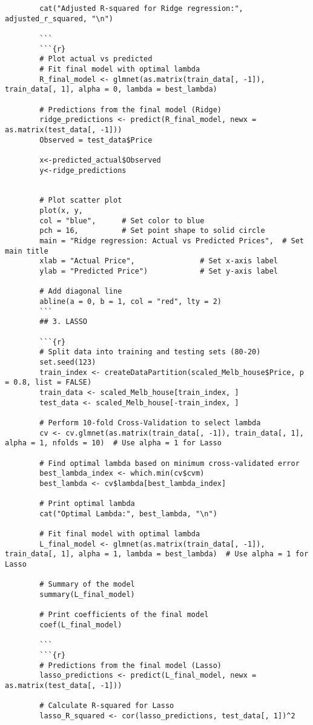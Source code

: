 \documentclass[12pt,doublespace]{article}
\begin{document}
\begin{lstlisting}
		cat("Adjusted R-squared for Ridge regression:", adjusted_r_squared, "\n")
		
		```
		```{r}
		# Plot actual vs predicted 
		# Fit final model with optimal lambda
		R_final_model <- glmnet(as.matrix(train_data[, -1]), train_data[, 1], alpha = 0, lambda = best_lambda)
		
		# Predictions from the final model (Ridge)
		ridge_predictions <- predict(R_final_model, newx = as.matrix(test_data[, -1]))
		Observed = test_data$Price
		
		x<-predicted_actual$Observed
		y<-ridge_predictions
		
		
		# Plot scatter plot
		plot(x, y, 
		col = "blue",      # Set color to blue
		pch = 16,          # Set point shape to solid circle
		main = "Ridge regression: Actual vs Predicted Prices",  # Set main title
		xlab = "Actual Price",               # Set x-axis label
		ylab = "Predicted Price")            # Set y-axis label
		
		# Add diagonal line
		abline(a = 0, b = 1, col = "red", lty = 2)
		```
		## 3. LASSO
		
		```{r}
		# Split data into training and testing sets (80-20)
		set.seed(123)
		train_index <- createDataPartition(scaled_Melb_house$Price, p = 0.8, list = FALSE)
		train_data <- scaled_Melb_house[train_index, ]
		test_data <- scaled_Melb_house[-train_index, ]
		
		# Perform 10-fold Cross-Validation to select lambda
		cv <- cv.glmnet(as.matrix(train_data[, -1]), train_data[, 1], alpha = 1, nfolds = 10)  # Use alpha = 1 for Lasso
		
		# Find optimal lambda based on minimum cross-validated error
		best_lambda_index <- which.min(cv$cvm)
		best_lambda <- cv$lambda[best_lambda_index]
		
		# Print optimal lambda
		cat("Optimal Lambda:", best_lambda, "\n")
		
		# Fit final model with optimal lambda
		L_final_model <- glmnet(as.matrix(train_data[, -1]), train_data[, 1], alpha = 1, lambda = best_lambda)  # Use alpha = 1 for Lasso
		
		# Summary of the model
		summary(L_final_model)
		
		# Print coefficients of the final model
		coef(L_final_model)
		
		```
		```{r}
		# Predictions from the final model (Lasso)
		lasso_predictions <- predict(L_final_model, newx = as.matrix(test_data[, -1]))
		
		# Calculate R-squared for Lasso
		lasso_R_squared <- cor(lasso_predictions, test_data[, 1])^2
		

\end{lstlisting}
\end{document}
